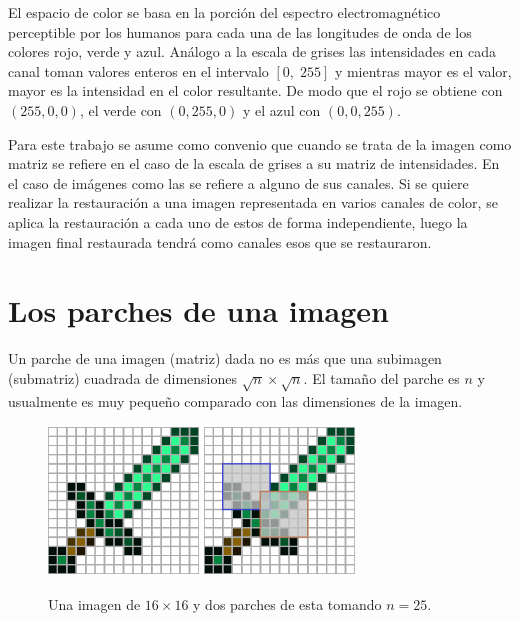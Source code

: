 El espacio de color \RGB se basa en la porción del espectro electromagnético perceptible por los humanos para cada una de las longitudes de onda de los colores rojo, verde y azul. An\'alogo a la escala de grises las intensidades en cada canal toman valores enteros en el intervalo $[0,\; 255]$ y mientras mayor es el valor, mayor es la intensidad en el color resultante. De modo que el rojo se obtiene con $(255,0,0)$, el verde con $(0,255,0)$ y el azul con $(0,0,255)$.

Para este trabajo se asume como convenio que cuando se trata de la imagen como matriz se refiere en el caso de la escala de grises a su matriz de intensidades. En el caso de im\'agenes como las \RGB se refiere a alguno de sus canales. Si se quiere realizar la restauraci\'on a una imagen representada en varios canales de color, se aplica la restauraci\'on a cada uno de estos de forma independiente, luego la imagen final restaurada tendr\'a como canales esos que se restauraron.


\section{Los parches de una imagen}\label{sec:patches}

\begin{definition}
	Un parche  de una imagen (matriz) dada no es m\'as que una subimagen (submatriz) cuadrada de dimensiones $\sqrt{n} \times \sqrt{n}$. El tamaño del parche es $n$ y usualmente es muy peque\~no comparado con las dimensiones de la imagen.
\end{definition}

\begin{figure}[h]
	\centering
	\includegraphics[width=4cm, height=4cm]{Graphics/diamon_sword.png}
	\hspace{1cm}
	\includegraphics[width=4cm, height=4cm]{Graphics/diamon_sword_with_patches.png}
	\caption{Una imagen de $16 \times 16$ y dos parches de esta tomando $n = 25$.}
	\label{ex:patches}
\end{figure}

